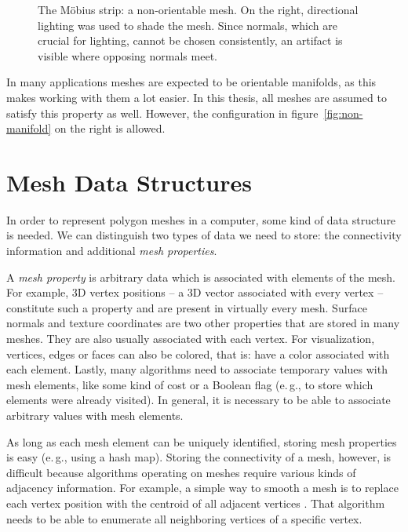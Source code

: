 \begin{figure}[t]
  \centering
  
  \caption{The Möbius strip: a non-orientable mesh.
    On the right, directional lighting was used to shade the mesh.
    Since normals, which are crucial for lighting, cannot be chosen consistently, an artifact is visible where opposing normals meet.}
  \label{fig:moebius}
\end{figure}


In many applications meshes are expected to be orientable manifolds, as this makes working with them a lot easier.
In this thesis, all meshes are assumed to satisfy this property as well.
However, the configuration in figure~\ref{fig:non-manifold} on the right is allowed.


\section{Mesh Data Structures}

In order to represent polygon meshes in a computer, some kind of data structure is needed.
We can distinguish two types of data we need to store: the connectivity information and additional \emph{mesh properties}.

A \emph{mesh property} is arbitrary data which is associated with elements of the mesh.
For example, 3D vertex positions -- a 3D vector associated with every vertex -- constitute such a property and are present in virtually every mesh.
Surface normals and texture coordinates are two other properties that are stored in many meshes.
They are also usually associated with each vertex.
For visualization, vertices, edges or faces can also be colored, that is: have a color associated with each element.
Lastly, many algorithms need to associate temporary values with mesh elements, like some kind of cost or a Boolean flag (e.\,g., to store which elements were already visited).
In general, it is necessary to be able to associate arbitrary values with mesh elements.

As long as each mesh element can be uniquely identified, storing mesh properties is easy (e.\,g., using a hash map).
Storing the connectivity of a mesh, however, is difficult because algorithms operating on meshes require various kinds of adjacency information.
For example, a simple way to smooth a mesh is to replace each vertex position with the centroid of all adjacent vertices \cite[Chapter~3]{botsch2010polygon}.
That algorithm needs to be able to enumerate all neighboring vertices of a specific vertex.

